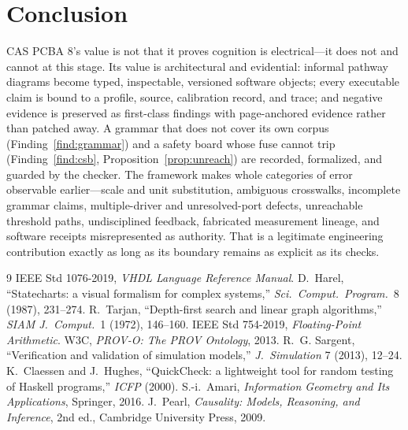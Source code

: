 \documentclass[11pt]{amsart}
\theoremstyle{definition}
\theoremstyle{remark}
\begin{document}
\section{Conclusion}

CAS PCBA 8's value is not that it proves cognition is electrical---it does not and cannot at this stage. Its value is architectural and evidential: informal pathway diagrams become typed, inspectable, versioned software objects; every executable claim is bound to a profile, source, calibration record, and trace; and negative evidence is preserved as first-class findings with page-anchored evidence rather than patched away. A grammar that does not cover its own corpus (Finding~\ref{find:grammar}) and a safety board whose fuse cannot trip (Finding~\ref{find:csb}, Proposition~\ref{prop:unreach}) are recorded, formalized, and guarded by the checker. The framework makes whole categories of error observable earlier---scale and unit substitution, ambiguous crosswalks, incomplete grammar claims, multiple-driver and unresolved-port defects, unreachable threshold paths, undisciplined feedback, fabricated measurement lineage, and software receipts misrepresented as authority. That is a legitimate engineering contribution exactly as long as its boundary remains as explicit as its checks.

\begin{thebibliography}{9}
 IEEE Std 1076-2019, \emph{VHDL Language Reference Manual}.
 D.~Harel, ``Statecharts: a visual formalism for complex systems,'' \emph{Sci.\ Comput.\ Program.}\ 8 (1987), 231--274.
 R.~Tarjan, ``Depth-first search and linear graph algorithms,'' \emph{SIAM J.\ Comput.}\ 1 (1972), 146--160.
 IEEE Std 754-2019, \emph{Floating-Point Arithmetic}.
 W3C, \emph{PROV-O: The PROV Ontology}, 2013.
 R.~G. Sargent, ``Verification and validation of simulation models,'' \emph{J.\ Simulation} 7 (2013), 12--24.
 K.~Claessen and J.~Hughes, ``QuickCheck: a lightweight tool for random testing of Haskell programs,'' \emph{ICFP} (2000).
 S.-i.~Amari, \emph{Information Geometry and Its Applications}, Springer, 2016.
 J.~Pearl, \emph{Causality: Models, Reasoning, and Inference}, 2nd ed., Cambridge University Press, 2009.
\end{thebibliography}
\end{document}

